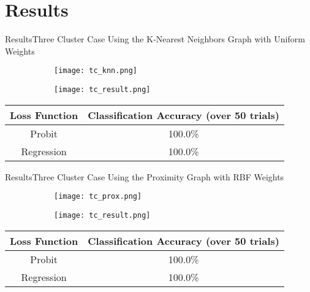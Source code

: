 \section{Results}

\begin{frame}{Results}{Three Cluster Case}
    Using the K-Nearest Neighbors Graph with Uniform Weights
    \begin{figure}[h!]
        \begin{subfigure}[b]{0.45\textwidth}
            \texttt{[image: tc\_knn.png]}
        \end{subfigure}
        \begin{subfigure}[b]{0.45\textwidth}
            \texttt{[image: tc\_result.png]}
        \end{subfigure}
    \end{figure}
    \begin{center}
        \begin{tabular}{|c|c|}
            \hline
            Loss Function & Classification Accuracy (over 50 trials) \\
            \hline
            Probit & 100.0\% \\
            Regression & 100.0\% \\
            \hline
        \end{tabular}
    \end{center}
\end{frame}

\begin{frame}{Results}{Three Cluster Case}
    Using the Proximity Graph with RBF Weights
    \begin{figure}[h!]
        \begin{subfigure}[b]{0.45\textwidth}
            \texttt{[image: tc\_prox.png]}
        \end{subfigure}
        \begin{subfigure}[b]{0.45\textwidth}
            \texttt{[image: tc\_result.png]}
        \end{subfigure}
    \end{figure}
    \begin{center}
        \begin{tabular}{|c|c|}
            \hline
            Loss Function & Classification Accuracy (over 50 trials) \\
            \hline
            Probit & 100.0\% \\
            Regression & 100.0\% \\
            \hline
        \end{tabular}
    \end{center}
\end{frame}

